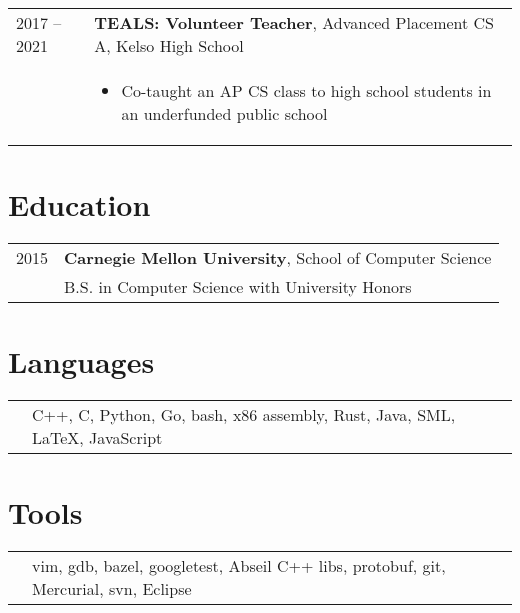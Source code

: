 \documentclass[overlapped]{res}
\newcommand{\experience}[5]{
  \hspace{-9ex}
  \begin{tabular}{m{12ex} m{\textwidth}}
    #1 -- #2 & \textbf{#3}, #4 \\
    & #5
  \end{tabular}
  \vspace{-3ex}
}
\newcommand{\education}[4]{
  \hspace{-9ex}
  \begin{tabular}{m{12ex} m{\textwidth}}
    \hfill #1 & \textbf{#2}, #3 \\
    & #4
  \end{tabular}
  \vspace{-3ex}
}
\newcommand{\skills}[1]{
  \hspace{-9ex}
  \begin{tabular}{m{12ex} m{\textwidth}}
    & #1
  \end{tabular}
  \vspace{-4ex}
}
\begin{document}
\begin{resume}
  \experience{2017}{2021}{TEALS: Volunteer Teacher}{Advanced Placement CS A, Kelso High School}{
    \begin{itemize} \itemsep -1pt
      \item Co-taught an AP CS class to high school students in an
        underfunded public school
    \end{itemize}
  }

\section{Education}
  \vspace{0.5ex}

  \education{2015}{Carnegie Mellon University}{School of Computer Science}
  {B.S. in Computer Science with University Honors}

\section{Languages}
  \skills{C++, C, Python, Go, bash, x86 assembly, Rust, Java, SML, \LaTeX, JavaScript}

\section{Tools}
  \skills{vim, gdb, bazel, googletest, Abseil C++ libs, protobuf, git, Mercurial, svn, Eclipse}

\end{resume}
\end{document}
